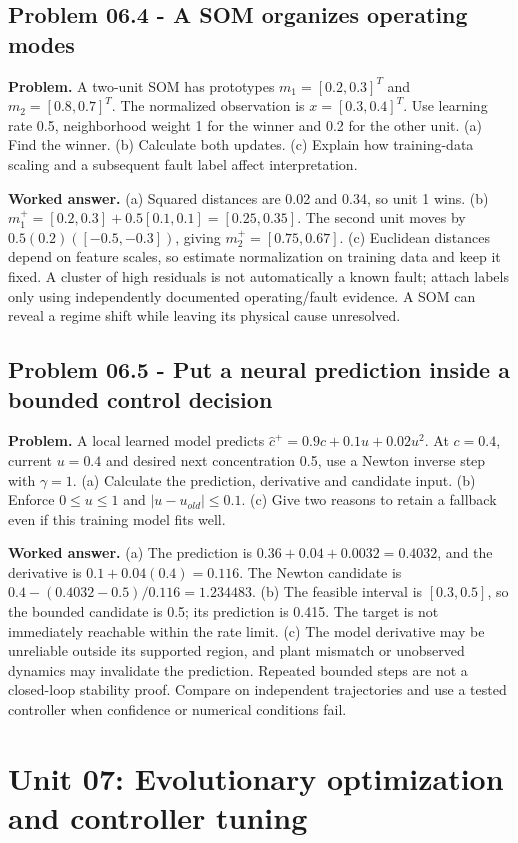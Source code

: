 \documentclass[11pt,a4paper]{article}
\begin{document}
\subsection{Problem 06.4 - A SOM organizes operating modes}
\textbf{Problem.} A two-unit SOM has prototypes $m_1=[0.2,0.3]^T$ and $m_2=[0.8,0.7]^T$. The normalized observation is $x=[0.3,0.4]^T$. Use learning rate 0.5, neighborhood weight 1 for the winner and 0.2 for the other unit. (a) Find the winner. (b) Calculate both updates. (c) Explain how training-data scaling and a subsequent fault label affect interpretation.


\textbf{Worked answer.} (a) Squared distances are 0.02 and 0.34, so unit 1 wins. (b) $m_1^+=[0.2,0.3]+0.5[0.1,0.1]=[0.25,0.35]$. The second unit moves by $0.5(0.2)([-0.5,-0.3])$, giving $m_2^+=[0.75,0.67]$. (c) Euclidean distances depend on feature scales, so estimate normalization on training data and keep it fixed. A cluster of high residuals is not automatically a known fault; attach labels only using independently documented operating/fault evidence. A SOM can reveal a regime shift while leaving its physical cause unresolved.

\subsection{Problem 06.5 - Put a neural prediction inside a bounded control decision}
\textbf{Problem.} A local learned model predicts $\hat c^+=0.9c+0.1u+0.02u^2$. At $c=0.4$, current $u=0.4$ and desired next concentration 0.5, use a Newton inverse step with $\gamma=1$. (a) Calculate the prediction, derivative and candidate input. (b) Enforce $0\leq u\leq1$ and $|u-u_{old}|\leq0.1$. (c) Give two reasons to retain a fallback even if this training model fits well.


\textbf{Worked answer.} (a) The prediction is $0.36+0.04+0.0032=0.4032$, and the derivative is $0.1+0.04(0.4)=0.116$. The Newton candidate is $0.4-(0.4032-0.5)/0.116=1.234483$. (b) The feasible interval is $[0.3,0.5]$, so the bounded candidate is 0.5; its prediction is 0.415. The target is not immediately reachable within the rate limit. (c) The model derivative may be unreliable outside its supported region, and plant mismatch or unobserved dynamics may invalidate the prediction. Repeated bounded steps are not a closed-loop stability proof. Compare on independent trajectories and use a tested controller when confidence or numerical conditions fail.


\clearpage\section{Unit 07: Evolutionary optimization and controller tuning}
\end{document}
